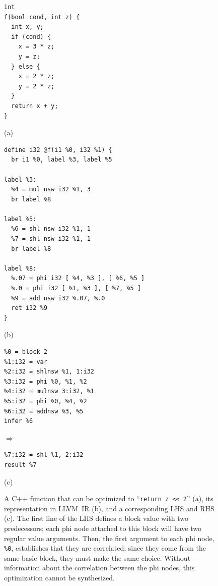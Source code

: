 \begin{figure}
\begin{minipage}[b]{0.30\textwidth}
{\small\begin{verbatim}
int
f(bool cond, int z) {
  int x, y;
  if (cond) {
    x = 3 * z;
    y = z;
  } else {
    x = 2 * z;
    y = 2 * z;
  }
  return x + y;
}
\end{verbatim}}
\centering (a)
\end{minipage}
%
\begin{minipage}[b]{0.40\textwidth}
{\small\begin{verbatim}
define i32 @f(i1 %0, i32 %1) {
  br i1 %0, label %3, label %5

label %3:
  %4 = mul nsw i32 %1, 3
  br label %8

label %5:
  %6 = shl nsw i32 %1, 1
  %7 = shl nsw i32 %1, 1
  br label %8

label %8:
  %.07 = phi i32 [ %4, %3 ], [ %6, %5 ]
  %.0 = phi i32 [ %1, %3 ], [ %7, %5 ]
  %9 = add nsw i32 %.07, %.0
  ret i32 %9
}
\end{verbatim}}
\centering (b)
\end{minipage}
%
\begin{minipage}[b]{0.33\textwidth}
{\small\begin{verbatim}
%0 = block 2
%1:i32 = var
%2:i32 = shlnsw %1, 1:i32
%3:i32 = phi %0, %1, %2
%4:i32 = mulnsw 3:i32, %1
%5:i32 = phi %0, %4, %2
%6:i32 = addnsw %3, %5
infer %6
\end{verbatim}}
$\Rightarrow$
{\small\begin{verbatim}
%7:i32 = shl %1, 2:i32
result %7
\end{verbatim}}
\centering (c)
\end{minipage}
\caption{A C++ function that can be optimized to ``\texttt{return z <<
    2}'' (a), its representation in LLVM~IR (b), and a corresponding
  \tool{} LHS and RHS (c).  The first line of the LHS defines a block
  value with two predecessors; each phi node attached to this block
  will have two regular value arguments.  Then, the first argument to
  each phi node, \texttt{\%0}, establishes that they are correlated:
  since they come from the same basic block, they must make the same
  choice. Without information about the correlation between the phi
  nodes, this optimization cannot be synthesized.}
\label{fig:phi}
\end{figure}
